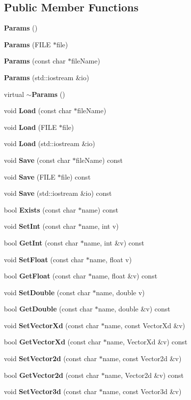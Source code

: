 \subsection*{\-Public \-Member \-Functions}
\begin{DoxyCompactItemize}
\item 
{\bf \-Params} ()
\item 
{\bf \-Params} (\-F\-I\-L\-E $\ast$file)
\item 
{\bf \-Params} (const char $\ast$file\-Name)
\item 
{\bf \-Params} (std\-::iostream \&io)
\item 
virtual {\bf $\sim$\-Params} ()
\item 
void {\bf \-Load} (const char $\ast$file\-Name)
\item 
void {\bf \-Load} (\-F\-I\-L\-E $\ast$file)
\item 
void {\bf \-Load} (std\-::iostream \&io)
\item 
void {\bf \-Save} (const char $\ast$file\-Name) const 
\item 
void {\bf \-Save} (\-F\-I\-L\-E $\ast$file) const 
\item 
void {\bf \-Save} (std\-::iostream \&io) const 
\item 
bool {\bf \-Exists} (const char $\ast$name) const 
\item 
void {\bf \-Set\-Int} (const char $\ast$name, int v)
\item 
bool {\bf \-Get\-Int} (const char $\ast$name, int \&v) const 
\item 
void {\bf \-Set\-Float} (const char $\ast$name, float v)
\item 
bool {\bf \-Get\-Float} (const char $\ast$name, float \&v) const 
\item 
void {\bf \-Set\-Double} (const char $\ast$name, double v)
\item 
bool {\bf \-Get\-Double} (const char $\ast$name, double \&v) const 
\item 
void {\bf \-Set\-Vector\-Xd} (const char $\ast$name, const \-Vector\-Xd \&v)
\item 
bool {\bf \-Get\-Vector\-Xd} (const char $\ast$name, \-Vector\-Xd \&v) const 
\item 
void {\bf \-Set\-Vector2d} (const char $\ast$name, const \-Vector2d \&v)
\item 
bool {\bf \-Get\-Vector2d} (const char $\ast$name, \-Vector2d \&v) const 
\item 
void {\bf \-Set\-Vector3d} (const char $\ast$name, const \-Vector3d \&v)

\end{DoxyCompactItemize}

